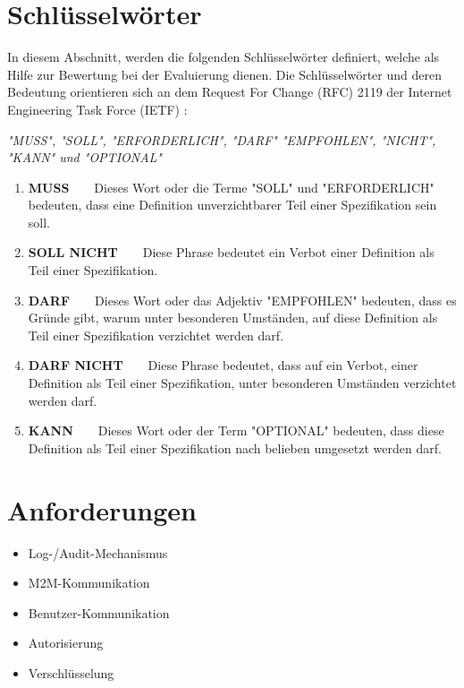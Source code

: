 \documentclass[11pt,a4paper]{report}
\begin{document}
\section{Schlüsselwörter}

In diesem Abschnitt, werden die folgenden Schlüsselwörter definiert, welche als Hilfe zur Bewertung bei der Evaluierung dienen. Die Schlüsselwörter und deren Bedeutung orientieren sich an dem Request For Change (RFC) 2119 der Internet Engineering Task Force (IETF) \cite{rfc_2119}:

\begin{center}
\textit{"MUSS", "SOLL", "ERFORDERLICH", "DARF" "EMPFOHLEN", "NICHT", "KANN" und "OPTIONAL"}
\end{center} 

\begin{enumerate}
\item \textbf{MUSS}~~~~Dieses Wort oder die Terme "SOLL" und "ERFORDERLICH" bedeuten, dass eine  Definition unverzichtbarer Teil einer Spezifikation sein soll.
\item \textbf{SOLL NICHT}~~~~Diese Phrase bedeutet ein Verbot einer Definition als Teil einer Spezifikation.
\item \textbf{DARF}~~~~Dieses Wort oder das Adjektiv "EMPFOHLEN" bedeuten, dass es  Gründe gibt, warum unter besonderen Umständen, auf diese Definition als Teil einer Spezifikation verzichtet werden darf. 
\item \textbf{DARF NICHT}~~~~Diese Phrase bedeutet, dass auf ein Verbot, einer Definition als Teil einer Spezifikation, unter besonderen Umständen verzichtet werden darf.
\item \textbf{KANN}~~~~Dieses Wort oder der Term "OPTIONAL" bedeuten, dass diese Definition als Teil einer Spezifikation nach belieben umgesetzt werden darf.
\end{enumerate}

\section{Anforderungen}

\begin{itemize}
\item Log-/Audit-Mechanismus
\item M2M-Kommunikation
\item Benutzer-Kommunikation
\item Autorisierung
\item Verschlüsselung
\end{itemize}
\end{document}
